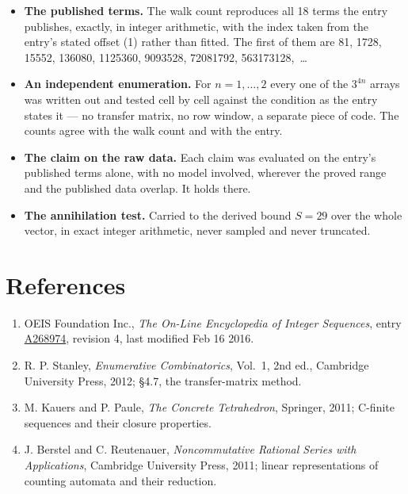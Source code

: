 \documentclass[11pt]{article}
\theoremstyle{definition}
\begin{document}
\begin{itemize}

\item {\bfseries The published terms.} The walk count reproduces all 18 terms the entry publishes, exactly, in integer arithmetic, with the index taken from the entry's stated offset (1) rather than fitted. The first of them are 81, 1728, 15552, 136080, 1125360, 9093528, 72081792, 563173128,~\dots

\item {\bfseries An independent enumeration.} For $n = 1,\dots,2$ every one of the $3^{4n}$ arrays was written out and tested cell by cell against the condition as the entry states it --- no transfer matrix, no row window, a separate piece of code. The counts agree with the walk count and with the entry.

\item {\bfseries The claim on the raw data.} Each claim was evaluated on the entry's published terms alone, with no model involved, wherever the proved range and the published data overlap. It holds there.

\item {\bfseries The annihilation test.} Carried to the derived bound $S = 29$ over the whole vector, in exact integer arithmetic, never sampled and never truncated.

\end{itemize}

\section{References}

\begin{enumerate}

\item OEIS Foundation Inc., \emph{The On-Line Encyclopedia of Integer Sequences}, entry \href{https://oeis.org/A268974}{A268974}, revision 4, last modified Feb 16 2016.

\item R. P. Stanley, \emph{Enumerative Combinatorics}, Vol.~1, 2nd ed., Cambridge University Press, 2012; \S4.7, the transfer-matrix method.

\item M. Kauers and P. Paule, \emph{The Concrete Tetrahedron}, Springer, 2011; C-finite sequences and their closure properties.

\item J. Berstel and C. Reutenauer, \emph{Noncommutative Rational Series with Applications}, Cambridge University Press, 2011; linear representations of counting automata and their reduction.

\end{enumerate}
\end{document}

